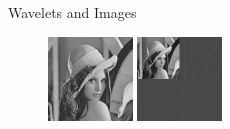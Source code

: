 \documentclass{beamer}
\def\RImageSize{0.2\textwidth}
\def\RImageSpace{\hspace{1cm}}
\begin{document}
\begin{frame}{Wavelets and Images}

  \begin{figure}[hbt]
    \begin{center}
      \includegraphics[width=\RImageSize]{lena512.jpg}
      \RImageSpace
      \includegraphics[width=\RImageSize]{lena-1step.jpg}

\end{center}
\end{figure}
\end{frame}
\end{document}
